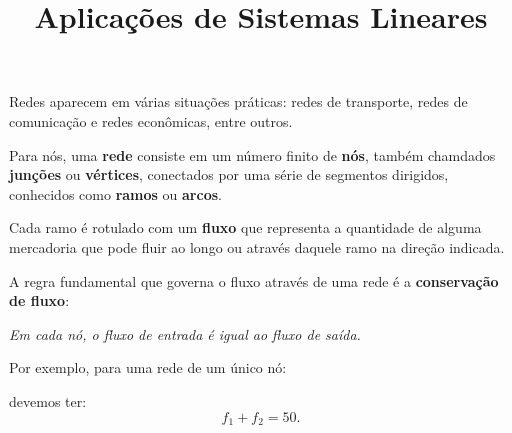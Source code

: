 \documentclass{beamer}
\title{Aplicações de Sistemas Lineares}
\author[\autor]{\autor}
\institute[\instituto]{\instituto}
\date{}
\begin{document}
    \begin{frame}
        \maketitle
    \end{frame}


    \begin{frame}

        Redes aparecem em várias situações práticas: \pause redes de transporte, \pause redes de comunicação \pause e redes econômicas, entre outros.\pause

        \vspace{1cm}

        Para nós, uma \textbf{rede} consiste em um número finito de \textbf{nós}, \pause também chamdados \textbf{junções} ou \textbf{vértices}, \pause conectados por uma série de segmentos dirigidos, \pause conhecidos como \textbf{ramos} ou \textbf{arcos}.\pause

        \vspace{1cm}

        Cada ramo é rotulado com um \textbf{fluxo} \pause que representa a quantidade de alguma mercadoria \pause que pode fluir ao longo ou através daquele ramo na direção indicada.\pause

    \end{frame}

    \begin{frame}
        A regra fundamental que governa o fluxo através de uma rede é a \textbf{conservação de fluxo}:\pause

        \begin{definicao}
          \textit{Em cada nó, o fluxo de entrada é igual ao fluxo de saída.}
        \end{definicao}
    \end{frame}

    \begin{frame}
        Por exemplo, para uma rede de um único nó:
        \begin{figure}[!h]
            \centering
            
        \end{figure}\pause
        devemos ter:
        \[
            f_1 + f_2 = 50.
        \]
    \end{frame}
\end{document}
